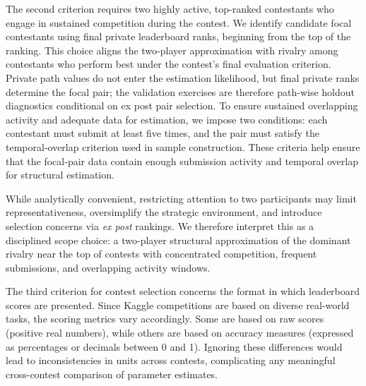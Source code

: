 \documentclass[mnsc]{informs3}
\begin{document}
The second criterion requires two highly active, top-ranked contestants who engage in sustained competition during the contest. We identify candidate focal contestants using final private leaderboard ranks, beginning from the top of the ranking. This choice aligns the two-player approximation with rivalry among contestants who perform best under the contest's final evaluation criterion. Private path values do not enter the estimation likelihood, but final private ranks determine the focal pair; the validation exercises are therefore path-wise holdout diagnostics conditional on ex post pair selection.
To ensure sustained overlapping activity and adequate data for estimation, we impose two conditions: each contestant must submit at least five times, and the pair must satisfy the temporal-overlap criterion used in sample construction.
These criteria help ensure that the focal-pair data contain enough submission activity and temporal overlap for structural estimation.

While analytically convenient, restricting attention to two participants may limit representativeness, oversimplify the strategic environment, and introduce selection concerns via \textit{ex post} rankings.
We therefore interpret this as a disciplined scope choice: a two-player structural approximation of the dominant rivalry near the top of contests with concentrated competition, frequent submissions, and overlapping activity windows.

The third criterion for contest selection concerns the format in which leaderboard scores are presented.
Since Kaggle competitions are based on diverse real-world tasks, the scoring metrics vary accordingly.
Some are based on raw scores (positive real numbers), while others are based on accuracy measures (expressed as percentages or decimals between 0 and 1).
Ignoring these differences would lead to inconsistencies in units across contests, complicating any meaningful cross-contest comparison of parameter estimates.
\end{document}
